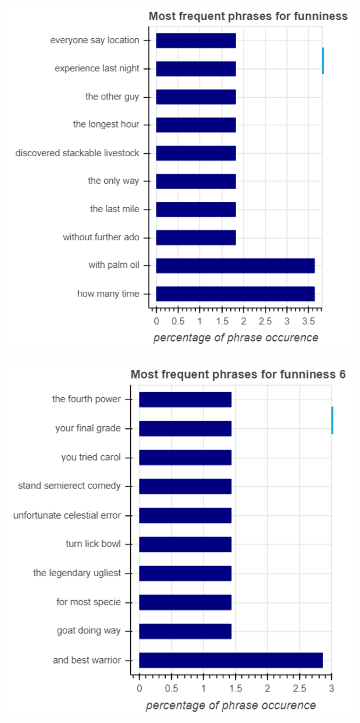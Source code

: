 \documentclass[draft,final,oneside]{vutinfth} %
\begin{document}
\begin{figure}
\centering

\begin{subfigure}[b]{0.45\textwidth}
\centering
\includegraphics[width=1.0\textwidth]{graphics/phrases/funniness_5}
\end{subfigure}\quad
\begin{subfigure}[b]{0.45\textwidth}
\centering
\includegraphics[width=1.0\textwidth]{graphics/phrases/funniness_6}
\end{subfigure}



\end{figure}
\end{document}
